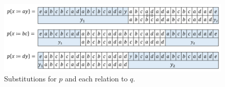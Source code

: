 \begin{figure}[t]
\includegraphics[width=\linewidth]{figs/Exam_b=a_c=d.png}
\caption{Substitutions for $p$ and each relation to $q$.}
\label{b=aとc=dの例}
\end{figure}

